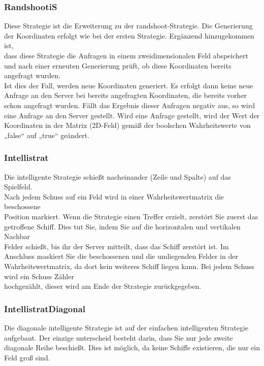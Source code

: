 \subsubsection{RandshootiS}

Diese Strategie ist die Erweiterung zu der randshoot-Strategie. Die Generierung der
Koordinaten erfolgt wie bei der ersten Strategie. Ergänzend hinzugekommen ist, \\dass
diese Strategie die Anfragen in einem zweidimensionalen Feld abspeichert und nach
einer erneuten Generierung prüft, ob diese Koordinaten bereits angefragt wurden. \\Ist
dies der Fall, werden neue Koordinaten generiert. Es erfolgt dann keine neue Anfrage an
den Server bei bereits angefragten Koordinaten, die bereits vorher schon angefragt
wurden. Fällt das Ergebnis dieser Anfragen negativ aus, so wird eine Anfrage an den
Server gestellt. Wird eine Anfrage gestellt, wird der Wert der Koordinaten in der Matrix
(2D-Feld) gemäß der boolschen Wahrheitswerte von „false“ auf „true“ geändert.

\subsubsection{Intellistrat}

Die intelligente Strategie schießt nacheinander (Zeile und Spalte) auf das Spielfeld. \\Nach jedem Schuss auf ein Feld wird in einer Wahrheitswertmatrix die 
beschossene \\Position markiert. Wenn die Strategie einen Treffer erzielt, zerstört Sie zuerst das \\getroffene Schiff. Dies tut Sie, indem Sie auf die horizontalen 
und vertikalen Nachbar \\Felder schießt, bis ihr der Server mitteilt, dass das Schiff zerstört ist. Im Anschluss maskiert Sie die beschossenen und die umliegenden 
Felder in der Wahrheitswertmatrix, da dort kein weiteres Schiff liegen kann. Bei jedem Schuss wird ein Schuss Zähler \\hochgezählt, dieser wird am Ende der 
Strategie zurückgegeben.

\subsubsection{IntellistratDiagonal}

Die diagonale intelligente Strategie ist auf der einfachen intelligenten Strategie aufgebaut. Der einzige unterscheid besteht darin, dass Sie nur jede zweite 
diagonale Reihe beschießt. Dies ist möglich, da keine Schiffe existieren, die nur ein Feld groß sind.

